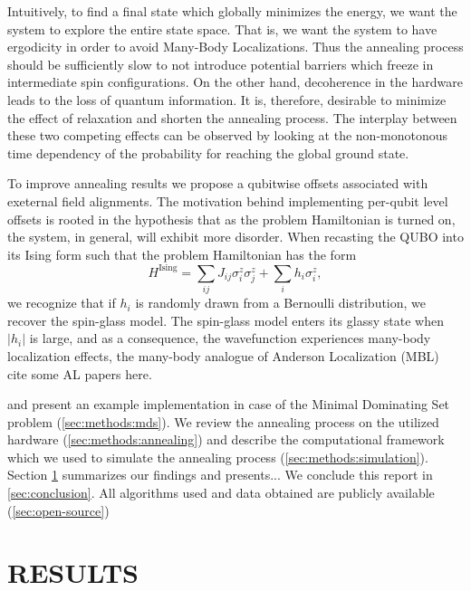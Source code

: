 \documentclass[prd,twocolumn,tightenlines,preprintnumbers,showpacs,superscriptaddress,notitlepage,nofootinbib,eqsecnum,floatfix,longbibliography,aps,10pt]{revtex4-2}
\begin{document}
Intuitively, to find a final state which globally minimizes the energy, we want the system to explore the entire state space.
That is, we want the system to have ergodicity in order to avoid Many-Body Localizations.
Thus the annealing process should be sufficiently slow to not introduce potential barriers which freeze in intermediate spin configurations.
On the other hand, decoherence in the hardware leads to the loss of quantum information.
It is, therefore, desirable to minimize the effect of relaxation and shorten the annealing process.
The interplay between these two competing effects can be observed by looking at the non-monotonous time dependency of the probability for reaching the global ground state.


To improve annealing results we propose a qubitwise offsets associated with exeternal field alignments.
The motivation behind implementing per-qubit level offsets is rooted in the hypothesis that as the problem Hamiltonian is turned on, the system, in general, will exhibit more disorder.
When recasting the QUBO into its Ising form such that the problem Hamiltonian has the form
\begin{equation}
 H^{\textrm{Ising}} = \sum_{ij} J_{ij} \sigma^z_i \sigma^z_j + \sum_i h_i \sigma^z_i,
\end{equation}
we recognize that if $h_i$ is randomly drawn from a Bernoulli distribution, we recover the spin-glass model.
The spin-glass model enters its glassy state when $|h_i|$ is large, and as a consequence, the wavefunction experiences many-body localization effects, the many-body analogue of Anderson Localization (MBL)~{\color{red} cite some AL papers here}.



 and present an example implementation in case of the Minimal Dominating Set problem (\ref{sec:methods:mds}).
We review the annealing process on the utilized hardware (\ref{sec:methods:annealing}) and describe the computational framework which we used to simulate the annealing process (\ref{sec:methods:simulation}).
Section \ref{sec:results} summarizes our findings and presents...
We conclude this report in \ref{sec:conclusion}.
All algorithms used and data obtained are publicly available (\ref{sec:open-source})





\section{RESULTS}
\label{sec:results}
\end{document}
